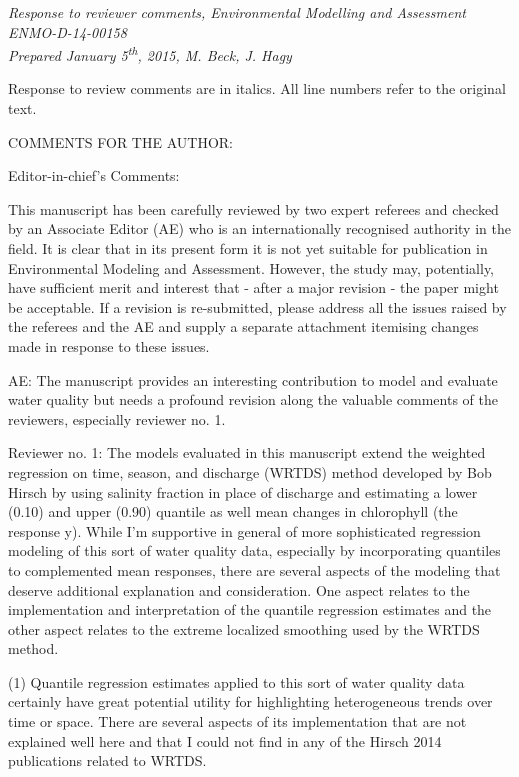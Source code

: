 \documentclass[letterpaper,12pt,oneside]{article}\usepackage[]{graphicx}\usepackage[]{color}
\begin{document}
\raggedbottom
\raggedright
{}
\setlength{\parindent}{0in}
\setlength{\parskip}{\baselineskip}

\textit{Response to reviewer comments, Environmental Modelling and Assessment ENMO-D-14-00158\\
Prepared January 5\textsuperscript{th}, 2015, M. Beck, J. Hagy}

Response to review comments are in italics.  All line numbers refer to the original text.

COMMENTS FOR THE AUTHOR:

Editor-in-chief's Comments:

This manuscript has been carefully reviewed by two expert referees and checked by an Associate Editor (AE) who is an internationally recognised authority in the field.  It is clear that in its present form it is not yet suitable for publication in Environmental Modeling and Assessment.  However, the study may, potentially, have sufficient merit and interest that - after a major revision - the paper might be acceptable. If a revision is re-submitted, please address all the issues raised by the referees and the AE and supply a separate attachment itemising changes made in response to these issues.



AE:
The manuscript provides an interesting contribution to model and evaluate water quality but needs a profound revision along the valuable comments of the reviewers, especially reviewer no. 1.


Reviewer no. 1: The models evaluated in this manuscript extend the weighted regression on time, season, and discharge (WRTDS) method developed by Bob Hirsch by using salinity fraction in place of discharge and estimating a lower (0.10) and upper (0.90) quantile as well mean changes in chlorophyll (the response y).  While I'm supportive in general of more sophisticated regression modeling of this sort of water quality data, especially by incorporating quantiles to complemented mean responses, there are several aspects of the modeling that deserve additional explanation and consideration.  One aspect relates to the implementation and interpretation of the quantile regression estimates and the other aspect relates to the extreme localized smoothing used by the WRTDS method.

(1)  Quantile regression estimates applied to this sort of water quality data certainly have great potential utility for highlighting heterogeneous trends over time or space.  There are several aspects of its implementation that are not explained well here and that I could not find in any of the Hirsch 2014 publications related to WRTDS. 
\end{document}

